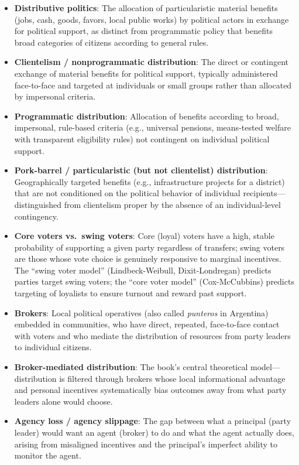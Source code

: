 \documentclass[12pt]{article}
\begin{document}
\begin{itemize}[leftmargin=*, itemsep=4pt]
    \item \textbf{Distributive politics}: The allocation of particularistic material benefits (jobs, cash, goods, favors, local public works) by political actors in exchange for political support, as distinct from programmatic policy that benefits broad categories of citizens according to general rules.
    \item \textbf{Clientelism / nonprogrammatic distribution}: The direct or contingent exchange of material benefits for political support, typically administered face-to-face and targeted at individuals or small groups rather than allocated by impersonal criteria.
    \item \textbf{Programmatic distribution}: Allocation of benefits according to broad, impersonal, rule-based criteria (e.g., universal pensions, means-tested welfare with transparent eligibility rules) not contingent on individual political support.
    \item \textbf{Pork-barrel / particularistic (but not clientelist) distribution}: Geographically targeted benefits (e.g., infrastructure projects for a district) that are not conditioned on the political behavior of individual recipients---distinguished from clientelism proper by the absence of an individual-level contingency.
    \item \textbf{Core voters vs.\ swing voters}: Core (loyal) voters have a high, stable probability of supporting a given party regardless of transfers; swing voters are those whose vote choice is genuinely responsive to marginal incentives. The ``swing voter model'' (Lindbeck-Weibull, Dixit-Londregan) predicts parties target swing voters; the ``core voter model'' (Cox-McCubbins) predicts targeting of loyalists to ensure turnout and reward past support.
    \item \textbf{Brokers}: Local political operatives (also called \emph{punteros} in Argentina) embedded in communities, who have direct, repeated, face-to-face contact with voters and who mediate the distribution of resources from party leaders to individual citizens.
    \item \textbf{Broker-mediated distribution}: The book's central theoretical model---distribution is filtered through brokers whose local informational advantage and personal incentives systematically bias outcomes away from what party leaders alone would choose.
    \item \textbf{Agency loss / agency slippage}: The gap between what a principal (party leader) would want an agent (broker) to do and what the agent actually does, arising from misaligned incentives and the principal's imperfect ability to monitor the agent.

\end{itemize}
\end{document}
